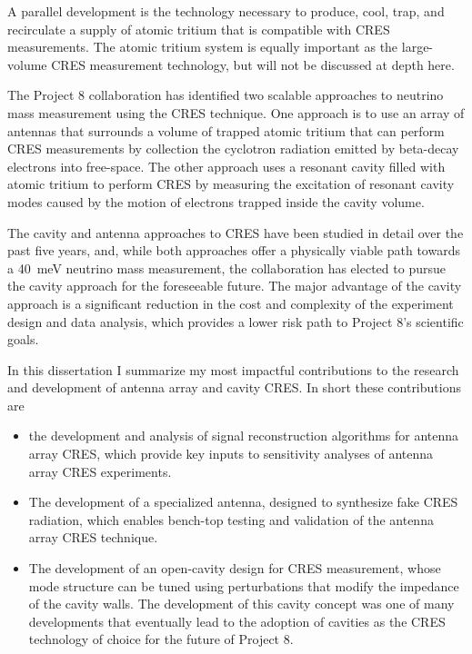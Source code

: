 A parallel development is the technology necessary to produce, cool, trap, and recirculate a supply of atomic tritium that is compatible with CRES measurements. The atomic tritium system is equally important as the large-volume CRES measurement technology, but will not be discussed at depth here.

The Project 8 collaboration has identified two scalable approaches to neutrino mass measurement using the CRES technique. One approach is to use an array of antennas that surrounds a volume of trapped atomic tritium that can perform CRES measurements by collection the cyclotron radiation emitted by beta-decay electrons into free-space. The other approach uses a resonant cavity filled with atomic tritium to perform CRES by measuring the excitation of resonant cavity modes caused by the motion of electrons trapped inside the cavity volume. 

The cavity and antenna approaches to CRES have been studied in detail over the past five years, and, while both approaches offer a physically viable path towards a 40~meV neutrino mass measurement, the collaboration has elected to pursue the cavity approach for the foreseeable future. The major advantage of the cavity approach is a significant reduction in the cost and complexity of the experiment design and data analysis, which provides a lower risk path to Project 8's scientific goals. 

In this dissertation I summarize my most impactful contributions to the research and development of antenna array and cavity CRES. In short these contributions are
\begin{itemize}
    \item the development and analysis of signal reconstruction algorithms for antenna array CRES, which provide key inputs to sensitivity analyses of antenna array CRES experiments.
    \item The development of a specialized antenna, designed to synthesize fake CRES radiation, which enables bench-top testing and validation of the antenna array CRES technique.
    \item The development of an open-cavity design for CRES measurement, whose mode structure can be tuned using perturbations that modify the impedance of the cavity walls. The development of this cavity concept was one of many developments that eventually lead to the adoption of cavities as the CRES technology of choice for the future of Project 8. 
\end{itemize}

